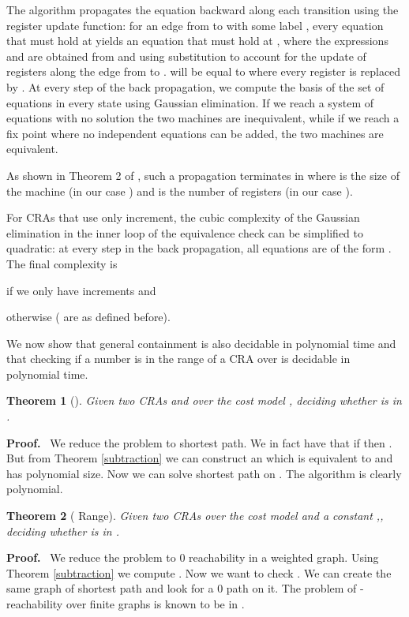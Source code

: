 \documentclass[11pt]{article}
\newtheorem{theorem}{Theorem}
\def\Proof{{\bf Proof.}}
\def\qed{{\bf }}
\def\qed{{\bf }}
\begin{document}
The algorithm propagates the
equation  backward along each
transition using the register update function: for an edge from  to
 with some label , every equation  that must hold at
 yields an equation  that must hold at , where the
expressions  and  are obtained from  and  using
substitution to account for the update of registers along the edge
from  to .   will be equal to  where every register
 is replaced by .  At every
step of the back propagation, we compute the basis of the set of
equations in every state using Gaussian elimination.  If we reach a
system of equations with no solution the two machines are
inequivalent, while if we reach a fix point where no independent
equations can be added, the two machines are equivalent.

As shown in Theorem 2 of \cite{olm_note_2004}, such a propagation
terminates in  where  is the size of the machine (in
our case ) and  is the
number of registers (in our case
).



For CRAs that use only increment, the cubic complexity of the Gaussian
elimination in the inner loop of the equivalence check can be
simplified to quadratic: at every step  in the back propagation, all
equations are of the form .  The final complexity is

if we only have increments and

otherwise ( are as defined before).
\qed

We now show that general containment is also decidable in polynomial
time and that checking if a number is in the range of a CRA over
 is decidable in polynomial time.

\begin{theorem}[]
Given two CRAs  and  over the cost model ,
deciding whether 
is in .
\end{theorem}
\Proof~
We reduce the problem to shortest path. We in fact have that if
 then . But from Theorem
\ref{subtraction} we can construct an  which is equivalent to
 and has polynomial size. Now we can solve
shortest path on . The algorithm is clearly polynomial.
\qed

\begin{theorem}[ Range]
Given two CRAs   over the cost model  and a constant ,,
deciding whether  is in .
\end{theorem}
\Proof~
We reduce the problem to 0 reachability in a weighted graph. Using Theorem \ref{subtraction} we compute .
Now we want to check . We can create the same graph of shortest path
and look for a 0 path on it. The problem of -reachability over finite graphs is known to be in .
\qed
\end{document}
